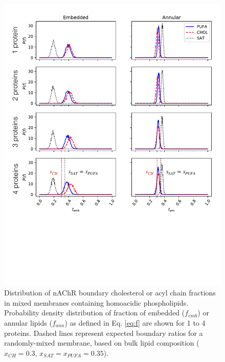 \begin{figure}[htp]
\includegraphics[width=\textwidth]{figure/figure3.pdf}
\caption[Distribution of nAChR boundary cholesterol or acyl chain fractions in mixed membranes containing homoacidic phospholipids.] {Distribution of nAChR boundary cholesterol or acyl chain fractions in mixed membranes containing homoacidic phospholipids. Probability density distribution of fraction of embedded ($f_{emb}$) or annular lipids ($f_{ann}$) as defined in Eq. \ref{eq:f} are shown for 1 to 4 proteins.  Dashed lines represent expected boundary ratios for a randomly-mixed membrane, based on bulk lipid composition ($x_{CH} = 0.3$, $x_{SAT}=x_{PUFA}= 0.35$).}
  \label{fig:Fig2a}
\end{figure}


